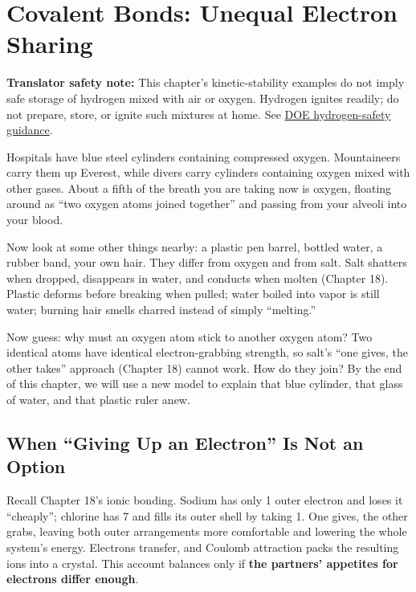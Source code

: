 \chapter{Covalent Bonds: Unequal Electron Sharing}

\begin{kaichang}
\textbf{Translator safety note:} This chapter's kinetic-stability examples do not imply safe storage of hydrogen mixed with air or oxygen. Hydrogen ignites readily; do not prepare, store, or ignite such mixtures at home. See \href{https://www.energy.gov/cmei/fuels/safe-use-hydrogen}{DOE hydrogen-safety guidance}.

Hospitals have blue steel cylinders containing compressed oxygen. Mountaineers carry them up Everest, while divers carry cylinders containing oxygen mixed with other gases. About a fifth of the breath you are taking now is oxygen, floating around as ``two oxygen atoms joined together'' and passing from your alveoli into your blood.

Now look at some other things nearby: a plastic pen barrel, bottled water, a rubber band, your own hair. They differ from oxygen and from salt. Salt shatters when dropped, disappears in water, and conducts when molten (Chapter 18). Plastic deforms before breaking when pulled; water boiled into vapor is still water; burning hair smells charred instead of simply ``melting.''

Now guess: why must an oxygen atom stick to another oxygen atom? Two identical atoms have identical electron-grabbing strength, so salt's ``one gives, the other takes'' approach (Chapter 18) cannot work. How do they join? By the end of this chapter, we will use a new model to explain that blue cylinder, that glass of water, and that plastic ruler anew.
\end{kaichang}

\section{When ``Giving Up an Electron'' Is Not an Option}

Recall Chapter 18's ionic bonding. Sodium has only 1 outer electron and loses it ``cheaply''; chlorine has 7 and fills its outer shell by taking 1. One gives, the other grabs, leaving both outer arrangements more comfortable and lowering the whole system's energy. Electrons transfer, and Coulomb attraction packs the resulting ions into a crystal. This account balances only if \textbf{the partners' appetites for electrons differ enough}.

